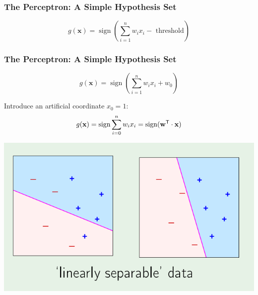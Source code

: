 \documentclass[xcolor=table]{beamer}
\newcommand{\vect}[1]{\ensuremath{\mathbf{#1}}}
\newcommand{\trans}[1]{\ensuremath{#1}^{\scriptsize{\textsf{T}}}}
\DeclareMathOperator{\sign}{sign}
\begin{document}
\begin{frame}[t]
\frametitle{The Perceptron: A Simple Hypothesis Set}
\[
    g(\vect{x}) = \sign \left (\sum_{i=1}^{n} w_i x_i - \text{ threshold} \right )
\]
\end{frame}

\begin{frame}[t]
\frametitle{The Perceptron: A Simple Hypothesis Set}
\[
    g(\vect{x}) = \sign \left (\sum_{i=1}^{n} w_i x_i + w_0\right )
\]

\pause

Introduce an artificial coordinate $x_0 = 1$:
\[
     g(\vect{x}) = \sign \sum_{i=0}^{n} w_i x_i = \sign(\trans{\vect{w}} \cdot \vect{x})
\]

\pause

\begin{center}
    \includegraphics[scale=0.25]{linearly_separable_data.png}
\end{center}
\end{frame}
\end{document}
